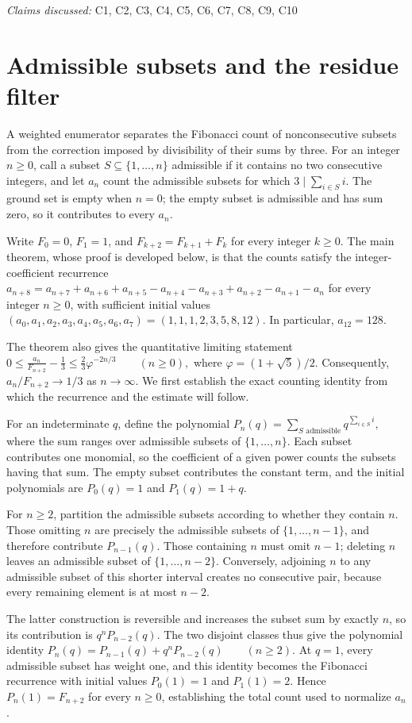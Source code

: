 \documentclass[11pt]{article}
\begin{document}
\textit{Claims discussed: }C1, C2, C3, C4, C5, C6, C7, C8, C9, C10
\section{Admissible subsets and the residue filter}
A weighted enumerator separates the Fibonacci count of nonconsecutive subsets from the correction imposed by divisibility of their sums by three. For an integer $n\geq 0$, call a subset $S\subseteq\{1,\ldots,n\}$ admissible if it contains no two consecutive integers, and let $a_n$ count the admissible subsets for which $3\mid\sum_{i\in S}i$. The ground set is empty when $n=0$; the empty subset is admissible and has sum zero, so it contributes to every $a_n$.

Write $F_0=0$, $F_1=1$, and $F_{k+2}=F_{k+1}+F_k$ for every integer $k\geq 0$. The main theorem, whose proof is developed below, is that the counts satisfy the integer-coefficient recurrence
$a_{n+8}=a_{n+7}+a_{n+6}+a_{n+5}-a_{n+4}-a_{n+3}+a_{n+2}-a_{n+1}-a_n$
for every integer $n\geq 0$, with sufficient initial values
$(a_0,a_1,a_2,a_3,a_4,a_5,a_6,a_7)=(1,1,1,2,3,5,8,12)$. In particular, $a_{12}=128$.

The theorem also gives the quantitative limiting statement
$0\leq \frac{a_n}{F_{n+2}}-\frac13\leq\frac23\varphi^{-2n/3}\qquad(n\geq 0),$
where $\varphi=(1+\sqrt5)/2$. Consequently, $a_n/F_{n+2}\to 1/3$ as $n\to\infty$. We first establish the exact counting identity from which the recurrence and the estimate will follow.

For an indeterminate $q$, define the polynomial
$P_n(q)=\sum_{S\text{ admissible}}q^{\sum_{i\in S}i},$
where the sum ranges over admissible subsets of $\{1,\ldots,n\}$. Each subset contributes one monomial, so the coefficient of a given power counts the subsets having that sum. The empty subset contributes the constant term, and the initial polynomials are $P_0(q)=1$ and $P_1(q)=1+q$.

For $n\geq 2$, partition the admissible subsets according to whether they contain $n$. Those omitting $n$ are precisely the admissible subsets of $\{1,\ldots,n-1\}$, and therefore contribute $P_{n-1}(q)$. Those containing $n$ must omit $n-1$; deleting $n$ leaves an admissible subset of $\{1,\ldots,n-2\}$. Conversely, adjoining $n$ to any admissible subset of this shorter interval creates no consecutive pair, because every remaining element is at most $n-2$.

The latter construction is reversible and increases the subset sum by exactly $n$, so its contribution is $q^nP_{n-2}(q)$. The two disjoint classes thus give the polynomial identity
$P_n(q)=P_{n-1}(q)+q^nP_{n-2}(q)\qquad(n\geq 2).$
At $q=1$, every admissible subset has weight one, and this identity becomes the Fibonacci recurrence with initial values $P_0(1)=1$ and $P_1(1)=2$. Hence $P_n(1)=F_{n+2}$ for every $n\geq 0$, establishing the total count used to normalize $a_n$.
\end{document}
